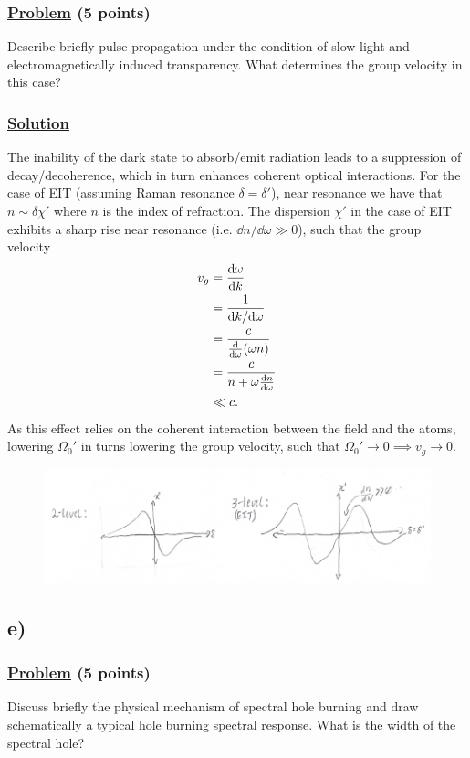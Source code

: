 \documentclass[12pt]{article}
\begin{document}
\subsubsection*{\underline{Problem} (5 points)}
Describe briefly pulse propagation under the condition of slow light and electromagnetically induced transparency.
What determines the group velocity in this case?

\subsubsection*{\underline{Solution}}
The inability of the dark state to absorb/emit radiation leads to a suppression of decay/decoherence, which in turn enhances coherent optical interactions.
For the case of EIT (assuming Raman resonance $\delta = \delta'$), near resonance we have that $n \sim \delta \chi'$ where $n$ is the index of refraction.
The dispersion $\chi'$ in the case of EIT exhibits a sharp rise near resonance (i.e. $\dd n/\dd\omega \gg 0$), such that the group velocity
\begin{align*}
    v_g &= \dv{\omega}{k} \\
    &= \frac{1}{\dd k/\dd\omega} \\
    &= \frac{c}{\dv{\omega}(\omega n)} \\
    &= \frac{c}{n + \omega\dv{n}{\omega}} \\
    &\ll c.
\end{align*}
As this effect relies on the coherent interaction between the field and the atoms, lowering $\Omega_0'$ in turns lowering the group velocity, such that $\Omega_0' \to 0 \implies v_g \to 0$.
\begin{figure}[h]
    \centering
    \includegraphics{1d.PNG}
\end{figure}


\subsection*{e)}
\subsubsection*{\underline{Problem} (5 points)}
Discuss briefly the physical mechanism of spectral hole burning and draw schematically a typical hole burning spectral response.
What is the width of the spectral hole?
\end{document}
